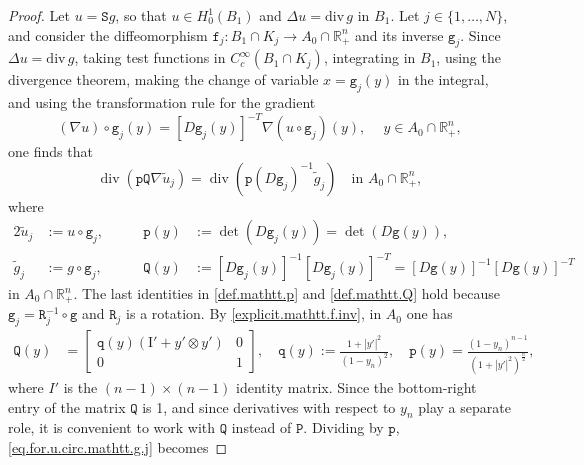 \documentclass[10pt,a4paper]{amsart}
\newcommand{\R}{{\mathbb R}}
\renewcommand{\div}{\mathrm{div}\,}
\DeclareMathOperator{\divergence}{div}
\newcommand{\grad}{\nabla}
\begin{document}
\begin{proof}
Let $u = \mathtt S g$,   
so that $u \in H^1_0(B_1)$ and $\Delta u = \div g$ in $B_1$. 
Let $j \in \{1, \ldots, N\}$, and consider the diffeomorphism 
$\mathtt f_j : B_1 \cap K_j \to A_0 \cap \R^n_+$ 
and its inverse $\mathtt g_j$. 
Since $\Delta u = \div g$, 
taking test functions in $C^{\infty}_c(B_1 \cap K_j)$, 
integrating in $B_1$, using the divergence theorem, 
making the change of variable $x = \mathtt g_j(y)$ in the integral, 
and using the transformation rule for the gradient
\begin{equation} \label{trans.rule.grad}
(\grad u) \circ \mathtt g_j (y) = [D \mathtt g_j(y)]^{-T} \grad( u \circ \mathtt g_j)(y), 
\quad \ y \in A_0 \cap \R^n_+,
\end{equation}
one finds that 
\begin{equation} \label{eq.for.u.circ.mathtt.g.j}
\divergence (\mathtt p \mathtt Q \grad \tilde u_j) 
= \divergence (\mathtt p (D \mathtt g_j)^{-1} \tilde g_j) 
\quad \text{in } A_0 \cap \R^n_+,
\end{equation}
where 
\begin{alignat}{2} 
\tilde u_j & := u \circ \mathtt g_j, \qquad & 
\mathtt p(y) & := \det (D \mathtt g_j(y)) = \det (D \mathtt g(y)), 
\label{def.mathtt.p}
\\
\tilde g_j & := g \circ \mathtt g_j, \qquad & 
\mathtt Q(y) & := [D \mathtt g_j(y)]^{-1} [D \mathtt g_j(y)]^{-T} 
= [D \mathtt g(y)]^{-1} [D \mathtt g(y)]^{-T}
\label{def.mathtt.Q}
\end{alignat}
in $A_0 \cap \R^n_+$. 
The last identities in \eqref{def.mathtt.p} and \eqref{def.mathtt.Q}
hold because $\mathtt g_j = \mathtt R_j^{-1} \circ \mathtt g$ 
and $\mathtt R_j$ is a rotation. 
By \eqref{explicit.mathtt.f.inv}, in $A_0$ one has 
\begin{align}
\label{una.buona.volta}
\mathtt Q(y) & = \begin{bmatrix} 
\mathtt q(y) (\mathrm{I'} + y' \otimes y')  & 0 \\
0 & 1 \end{bmatrix}\!\!,
\quad
\mathtt q(y) := \frac{1+|y'|^2}{(1-y_n)^2},
\quad  
\mathtt p(y) = \frac{ (1-y_n)^{n-1} }{ (1 + |y'|^2)^{\frac{n}{2}} },
\end{align}
where $I'$ is the $(n-1) \times (n-1)$ identity matrix. 
Since the bottom-right entry of the matrix $\mathtt Q$ is 1, 
and since derivatives with respect to $y_n$ play a separate role, 
it is convenient to work with $\mathtt Q$ instead of $\mathtt P$. 
Dividing by $\mathtt p$, \eqref{eq.for.u.circ.mathtt.g.j} becomes 

\end{proof}
\end{document}
